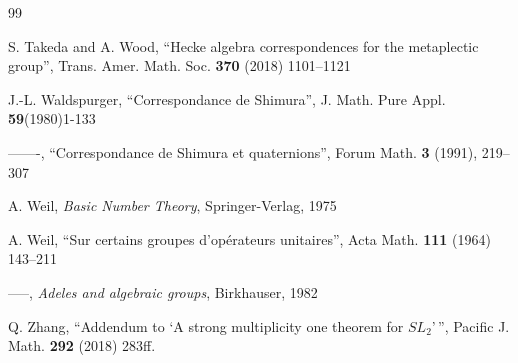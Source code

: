 \documentclass[12pt,letterpaper,openany]{book}
\theoremstyle{plain}
\theoremstyle{definition}
\theoremstyle{remark}
\theoremstyle{remark}
\begin{document}
\begin{thebibliography}{99}




 S. Takeda and A. Wood, ``Hecke algebra correspondences
for the metaplectic group'', Trans. Amer. Math. Soc. \textbf{370}
(2018) 1101--1121

 J.-L. Waldspurger, ``Correspondance de Shimura'',
J. Math. Pure Appl. \textbf{59}(1980)1-133

 -------, ``Correspondance de Shimura et quaternions'',
Forum Math. \textbf{3} (1991), 219--307

 A. Weil, \emph{Basic Number Theory},
Springer-Verlag, 1975

 A. Weil, ``Sur certains groupes d'op\'erateurs unitaires'',
Acta Math. \textbf{111} (1964) 143--211

 -----, \emph{Adeles and algebraic groups},
Birkhauser, 1982


 Q. Zhang, ``Addendum to `A strong multiplicity one theorem for $SL_2$'\,'',
Pacific J. Math. \textbf{292} (2018) 283ff.

\end{thebibliography}
\end{document}
